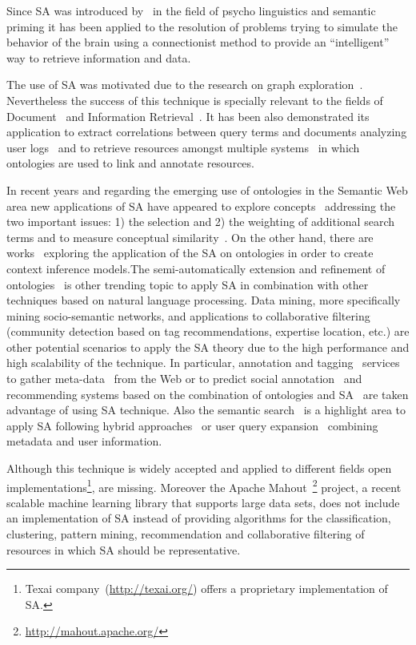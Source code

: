 Since SA was introduced by~\cite{Collins_Loftus_1975} in the field of 
psycho linguistics and semantic priming it has been applied to the resolution
of problems trying to simulate the behavior of the brain using a connectionist method
to provide an ``intelligent'' way to retrieve information and data. 

The use of SA was motivated due to the research on graph exploration~\cite{Scott1981}. Nevertheless
the success of this technique is specially relevant to the fields of Document~\cite{turtle91inference} 
and Information Retrieval~\cite{Cohen1987}. It has
been also demonstrated its application to extract correlations between query terms and documents analyzing user 
logs~\cite{Cui03} and to retrieve resources amongst multiple systems~\cite{Schumacher+2008search} 
in which ontologies are used to link and annotate resources.

In recent years and regarding the emerging use of ontologies in the Semantic Web area new applications of SA have
appeared to explore concepts~\cite{Qiu93,Chen95} addressing the two important issues: 1) the selection and 2) the weighting of
additional search terms and to measure conceptual similarity~\cite{gouws-vanrooyen-engelbrecht:2010:CCSR}. 
On the other hand, there are works~\cite{DBLP:journals/cogsr/KatiforiVD10} 
exploring the application of the SA on ontologies in order to create context inference models.The 
semi-automatically extension and refinement of ontologies~\cite{liu_et_al_2005} is other trending topic to apply SA
in combination with other techniques based on natural language processing. Data mining,
more specifically mining socio-semantic networks\cite{paper:troussov:2008}, and applications 
to collaborative filtering (community detection based on tag recommendations, expertise location, etc.) are other 
potential scenarios to apply the SA theory due to the high performance and high scalability of the technique. In particular, 
annotation and tagging~\cite{labraTagging2007} services to gather meta-data~\cite{GelgiVD05} from the Web or to predict social annotation~\cite{Chen:2007:PSA:1780653.1780702} and recommending 
systems based on the combination of ontologies and SA~\cite{citeulike:3779904} are taken advantage of using SA technique. 
Also the semantic search~\cite{conf-sofsem-Suchal08} is a highlight area to apply SA following
hybrid approaches~\cite{bopaEstonia,RochaSA04} or user query expansion~\cite{767402} combining metadata 
and user information.

Although this technique is widely accepted and applied to different fields open implementations\footnote{ 
Texai company~(\url{http://texai.org/}) offers a proprietary implementation of SA.}, are missing. Moreover 
the Apache Mahout~\footnote{\url{http://mahout.apache.org/}} project, a recent scalable machine learning library 
that supports large data sets, does not include an implementation of SA instead of 
providing algorithms for the classification, clustering, pattern mining, 
recommendation and collaborative filtering of resources in which SA should be representative. 
 


